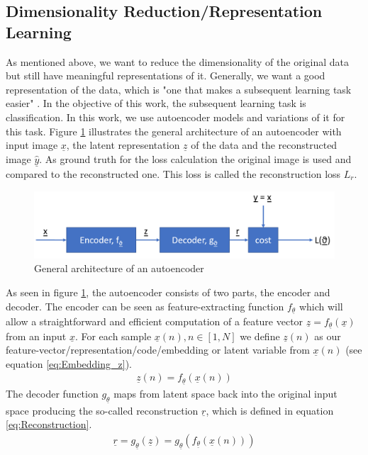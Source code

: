 \documentclass[12pt,DIV14,BCOR12mm,a4paper,footexclude,headinclude,halfparskip-,twoside,openright,openany,cleardoubleempty,idxtotoc,bibtotoc]{scrreprt} %
\numberwithin{equation}{chapter}
\begin{document}
\subsection{Dimensionality Reduction/Representation Learning}
As mentioned above, we want to reduce the dimensionality of the original data but still have meaningful representations of it. Generally, we want a good representation of the data, which is "one that makes a subsequent learning task easier" \cite{Goodfellow-et-al-2016}. In the objective of this work, the subsequent learning task is classification. In this work, we use autoencoder models and variations of it for this task. Figure \ref{fig:Autoencoder} illustrates the general architecture of an autoencoder with input image $\underline{x}$, the latent representation $\underline{z}$ of the data and the reconstructed image $\underline{\hat{y}}$. As ground truth for the loss calculation the original image is used and compared to the reconstructed one. This loss is called the reconstruction loss $L_{r}$.
\begin{figure}[htb!]
	\centering
	\includegraphics[width=0.6\linewidth]{Graphiken/Autoencoder_Architecture}
	\caption{General architecture of an autoencoder}
	\label{fig:Autoencoder}
\end{figure}
As seen in figure \ref{fig:Autoencoder}, the autoencoder consists of two parts, the encoder and decoder. The encoder can be seen as feature-extracting function $f_{\underline{\theta}}$ which will allow a straightforward and efficient computation of a feature vector $\underline{z} = f_{\underline{\theta}}(\underline{x})$ from an input $\underline{x}$. For each sample $\underline{x}(n), n \in [1,N]$ we define $\underline{z}(n)$ as our feature-vector/representation/code/embedding or latent variable from $\underline{x}(n)$ (see equation \ref{eq:Embedding_z}). 
\begin{align}
	\underline{z}(n) = f_{\underline{\theta}}(\underline{x}(n))\label{eq:Embedding_z}
\end{align}
The decoder function $g_{\underline{\theta}}$ maps from latent space back into the original input space producing the so-called reconstruction $\underline{r}$, which is defined in equation \ref{eq:Reconstruction}.
\begin{align}
	\underline{r} = g_{\underline{\theta}}(\underline{z}) = g_{\underline{\theta}}(f_{\underline{\theta}}(\underline{x}(n)))\label{eq:Reconstruction}
\end{align}
\end{document}
